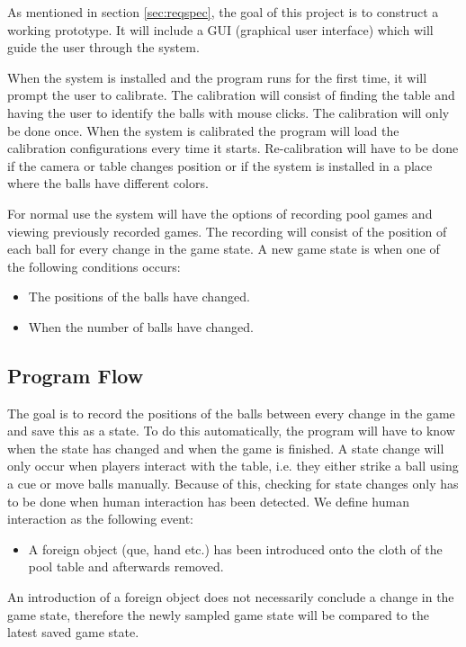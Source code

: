 As mentioned in section \ref{sec:reqspec}, the goal of this project is to construct a working prototype. It will include a GUI (graphical user interface) which will guide the user through the system.

When the system is installed and the program runs for the first time, it will prompt the user to calibrate. The calibration will consist of finding the table and having the user to identify the balls with mouse clicks. The calibration will only be done once. When the system is calibrated the program will load the calibration configurations every time it starts. Re-calibration will have to be done if the camera or table changes position or if the system is installed in a place where the balls have different colors.

For normal use the system will have the options of recording pool games and viewing previously recorded games. The recording will consist of the position of each ball for every change in the game state. A new game state is when one of the following conditions occurs: 
\begin{itemize}
	\item The positions of the balls have changed.
	\item When the number of balls have changed.
\end{itemize}

\subsection{Program Flow}
The goal is to record the positions of the balls between every change in the game and save this as a state. To do this automatically, the program will have to know when the state has changed and when the game is finished. A state change will only occur when players interact with the table, i.e. they either strike a ball using a cue or move balls manually. Because of this, checking for state changes only has to be done when human interaction has been detected. We define human interaction as the following event:
\begin{itemize}
	\item  A foreign object (que, hand etc.) has been introduced onto the cloth of the pool table and afterwards removed.
\end{itemize}

An introduction of a foreign object does not necessarily conclude a change in the game state, therefore the newly sampled game state will be compared to the latest saved game state.

